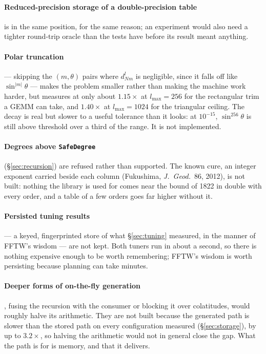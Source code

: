 \documentclass[11pt,a4paper]{article}
\newcommand{\code}[1]{\texttt{#1}}
\begin{document}
\paragraph{Reduced-precision storage of a double-precision table} is in
the same position, for the same reason; an experiment would also need a
tighter round-trip oracle than the tests have before its result meant
anything.

\paragraph{Polar truncation} --- skipping the $(m,\theta)$ pairs where
$d^l_{Nm}$ is negligible, since it falls off like $\sin^{|m|}\theta$ ---
makes the problem smaller rather than making the machine work harder, but
measures at only about $1.15\times$ at $l_{\max}=256$ for the rectangular
trim a GEMM can take, and $1.40\times$ at $l_{\max}=1024$ for the
triangular ceiling.  The decay is real but slower to a useful tolerance
than it looks: at $10^{-15}$, $\sin^{256}\theta$ is still above threshold
over a third of the range.  It is not implemented.

\paragraph{Degrees above \code{SafeDegree}} (\S\ref{sec:recursion}) are
refused rather than supported.  The known cure, an integer exponent carried
beside each column (Fukushima, \emph{J.\ Geod.}\ 86, 2012), is not built:
nothing the library is used for comes near the bound of 1822 in double with
every order, and a table of a few orders goes far higher without it.

\paragraph{Persisted tuning results} --- a keyed, fingerprinted store of
what \S\ref{sec:tuning} measured, in the manner of FFTW's wisdom --- are
not kept.  Both tuners run in about a second, so there is nothing
expensive enough to be worth remembering; FFTW's wisdom is worth persisting
because planning can take minutes.

\paragraph{Deeper forms of on-the-fly generation}, fusing the recursion
with the consumer or blocking it over colatitudes, would roughly halve its
arithmetic.  They are not built because the generated path is slower than
the stored path on every configuration measured (\S\ref{sec:storage}),
by up to $3.2\times$, so halving the arithmetic would not in general close
the gap.
What the path is for is memory, and that it delivers.
\end{document}
